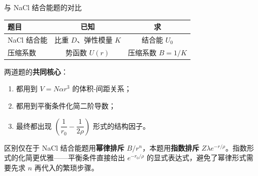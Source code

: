 \begin{insightbox}{与 NaCl 结合能题的对比}
\begin{center}
\renewcommand{\arraystretch}{1.5}
\begin{tabular}{|l|c|c|}
\hline
\textbf{题目} & \textbf{已知} & \textbf{求} \\
\hline
NaCl 结合能 & 比重 $D$、弹性模量 $K$ & 结合能 $U_0$ \\
压缩系数 & 势函数 $U(r)$ & 压缩系数 $B = 1/K$ \\
\hline
\end{tabular}
\end{center}

两道题的\textbf{共同核心}：
\begin{enumerate}[nosep]
  \item 都用到 $V = N\alpha r^3$ 的体积-间距关系；
  \item 都用到平衡条件化简二阶导数；
  \item 最终都出现 $\left(\dfrac{1}{r_0} - \dfrac{1}{2\rho}\right)$ 形式的结构因子。
\end{enumerate}

区别仅在于 NaCl 结合能题用\textbf{幂律排斥} $B/r^n$，本题用\textbf{指数排斥} $Z\lambda e^{-r/\rho}$。指数形式的化简更优雅——平衡条件直接给出 $e^{-r_0/\rho}$ 的显式表达式，避免了幂律形式需要先求 $n$ 再代入的繁琐步骤。
\end{insightbox}
